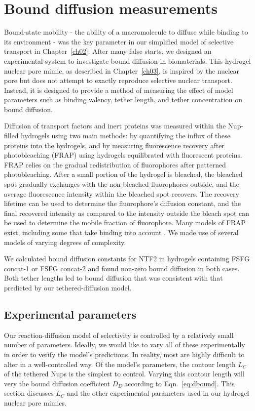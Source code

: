 \chapter{Bound diffusion measurements}\label{ch04}
\label{ch:bound-diffusion}

Bound-state mobility - the ability of a macromolecule to diffuse while binding to its environment - was the key parameter in our simplified model of selective transport in Chapter~\ref{ch02}.  After many false starts, we designed an experimental system to investigate bound diffusion in biomaterials.  This hydrogel nuclear pore mimic, as described in Chapter~\ref{ch03}, is inspired by the nuclear pore but does not attempt to exactly reproduce selective nuclear transport.  Instead, it is designed to provide a method of measuring the effect of model parameters such as binding valency, tether length, and tether concentration on bound diffusion.

Diffusion of transport factors and inert proteins was measured within the Nup-filled hydrogels using two main methods: by quantifying the influx of these proteins into the hydrogels, and by measuring fluorescence recovery after photobleaching (FRAP) using hydrogels equilibrated with fluorescent proteins.  FRAP relies on the gradual redistribution of fluorophores after patterned photobleaching.   After a small portion of the hydrogel is bleached, the bleached spot gradually exchanges with the non-bleached fluorophores outside, and the average fluorescence intensity within the bleached spot recovers.  The recovery lifetime can be used to determine the fluorophore's diffusion constant, and the final recovered intensity as compared to the intensity outside the bleach spot can be used to determine the mobile fraction of fluorophore.  Many models of FRAP exist, including some that take binding into account \cite{sprague04, wu12, kang10, kang12}. We made use of several models of varying degrees of complexity.

We calculated bound diffusion constants for NTF2 in hydrogels containing FSFG concat-1 or FSFG concat-2 and found non-zero bound diffusion in both cases.  Both tether lengths led to bound diffusion that was consistent with that predicted by our tethered-diffusion model.

\section{Experimental parameters}

Our reaction-diffusion model of selectivity is controlled by a relatively small number of parameters.  Ideally, we would like to vary all of these experimentally in order to verify the model's predictions.  In reality, most are highly difficult to alter in a well-controlled way.  Of the model's parameters, the contour length $L_C$ of the tethered Nups is the simplest to control.  Varying this contour length will very the bound diffusion coefficient $D_B$ according to Eqn.~\ref{eq:dbound}.  This section discusses $L_C$ and the other experimental parameters used in our hydrogel nuclear pore mimics.

